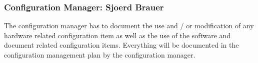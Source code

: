     \subsubsection{Configuration Manager: Sjoerd Brauer}
    The configuration manager has to document
    the use and / or modification of any hardware related configuration item as well as the use of the
    software and document related configuration items. Everything will be documented in the configuration management plan
    by the configuration manager.
